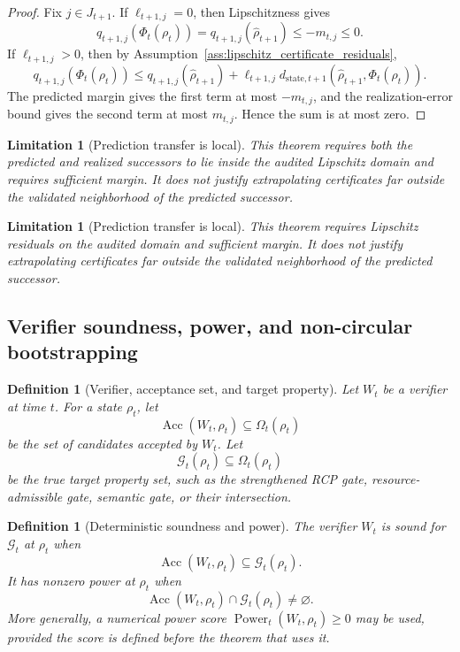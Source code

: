 \documentclass[11pt]{article}
\newtheorem{definition}[theorem]{Definition}
\newtheorem{limitation}[theorem]{Limitation}
\newcommand{\Gcal}{\mathcal{G}}
\newcommand{\1}{\mathbf{1}}
\newcommand{\state}{\mathrm{state}}
\providecommand{\Power}{\operatorname{Power}}
\providecommand{\Acc}{\operatorname{Acc}}
\begin{document}
\begin{proof}
Fix \(j\in J_{t+1}\).  If \(\ell_{t+1,j}=0\), then Lipschitzness gives
\[
q_{t+1,j}(\Phi_t(\rho_t))
=
q_{t+1,j}(\widehat\rho_{t+1})
\le
-m_{t,j}
\le0.
\]
If \(\ell_{t+1,j}>0\), then by Assumption~\ref{ass:lipschitz_certificate_residuals},
\[
q_{t+1,j}(\Phi_t(\rho_t))
\le
q_{t+1,j}(\widehat\rho_{t+1})
+
\ell_{t+1,j}d_{\state,t+1}(\widehat\rho_{t+1},\Phi_t(\rho_t)).
\]
The predicted margin gives the first term at most \(-m_{t,j}\), and the realization-error bound gives the second term at most \(m_{t,j}\).  Hence the sum is at most zero.
\end{proof}

\begin{limitation}[Prediction transfer is local]
This theorem requires both the predicted and realized successors to lie inside the audited Lipschitz domain and requires sufficient margin.  It does not justify extrapolating certificates far outside the validated neighborhood of the predicted successor.
\end{limitation}\begin{limitation}[Prediction transfer is local]
This theorem requires Lipschitz residuals on the audited domain and sufficient margin.  It does not justify extrapolating certificates far outside the validated neighborhood of the predicted successor.
\end{limitation}

\subsection{Verifier soundness, power, and non-circular bootstrapping}

\begin{definition}[Verifier, acceptance set, and target property]
\label{def:verifier_acceptance_target}
Let \(W_t\) be a verifier at time \(t\).  For a state \(\rho_t\), let
\[
\Acc(W_t,\rho_t)\subseteq\Omega_t(\rho_t)
\]
be the set of candidates accepted by \(W_t\).  Let
\[
\Gcal_t(\rho_t)\subseteq\Omega_t(\rho_t)
\]
be the true target property set, such as the strengthened RCP gate, resource-admissible gate, semantic gate, or their intersection.
\end{definition}

\begin{definition}[Deterministic soundness and power]
\label{def:deterministic_soundness_power}
The verifier \(W_t\) is sound for \(\Gcal_t\) at \(\rho_t\) when
\[
\Acc(W_t,\rho_t)\subseteq\Gcal_t(\rho_t).
\]
It has nonzero power at \(\rho_t\) when
\[
\Acc(W_t,\rho_t)\cap\Gcal_t(\rho_t)\ne\varnothing.
\]
More generally, a numerical power score \(\Power_t(W_t,\rho_t)\ge0\) may be used, provided the score is defined before the theorem that uses it.
\end{definition}
\end{document}
